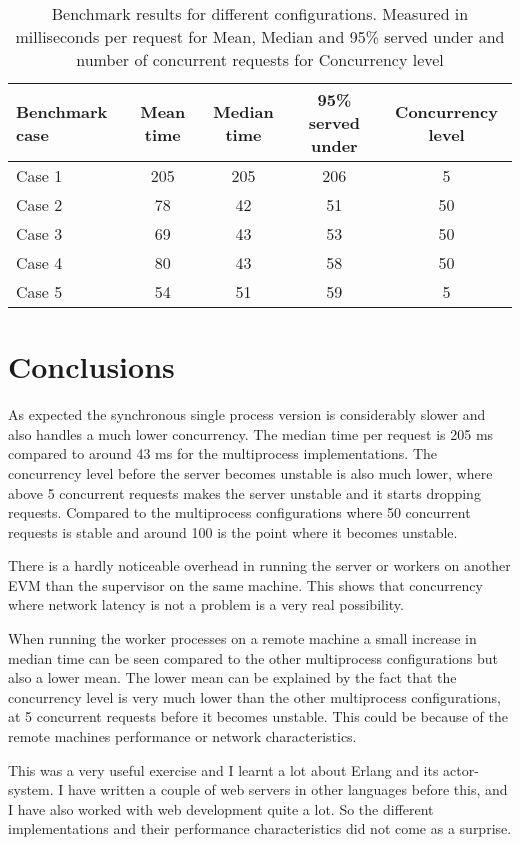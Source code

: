 \documentclass[a4paper, 11pt]{article}
\begin{document}
\begin{table}[h]
\centering
\begin{tabular}{lcccc}
Benchmark case & Mean time & Median time & 95\% served under & Concurrency level\\\hline
Case 1 & 205 & 205 & 206 & 5\\\hline
Case 2 & 78 & 42 & 51 & 50\\\hline
Case 3 & 69 & 43 & 53 & 50\\\hline
Case 4 & 80 & 43 & 58 & 50\\\hline
Case 5 & 54 & 51 & 59 & 5\\\hline
\end{tabular}
\caption{Benchmark results for different configurations. Measured in milliseconds per request for Mean, Median and
95\% served under and number of concurrent requests for Concurrency level}
\label{tab:results}
\end{table}

\section{Conclusions}

As expected the synchronous single process version is considerably slower and also handles a much lower concurrency. The
median time per request is 205 ms compared to around 43 ms for the multiprocess implementations. The concurrency level
before the server becomes unstable is also much lower, where above 5 concurrent requests makes the server unstable
and it starts dropping requests. Compared to the multiprocess configurations where 50 concurrent requests is stable
and around 100 is the point where it becomes unstable.

There is a hardly noticeable overhead in running the server or workers on another EVM than the supervisor on the same
machine. This shows that concurrency where network latency is not a problem is a very real possibility.

When running the worker processes on a remote machine a small increase in median time can be seen compared to the other
multiprocess configurations but also a lower mean. The lower mean can be explained by the fact that the concurrency
level is very much lower than the other multiprocess configurations, at 5 concurrent requests before it becomes unstable.
This could be because of the remote machines performance or network characteristics.

This was a very useful exercise and I learnt a lot about Erlang and its actor-system. I have written a couple of
web servers in other languages before this, and I have also worked with web development quite a lot. So the different
implementations and their performance characteristics did not come as a surprise.
\end{document}

